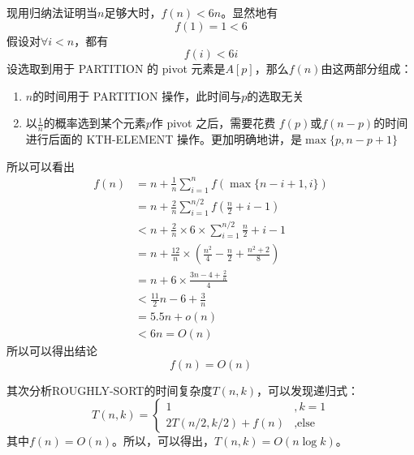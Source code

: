 \documentclass[UTF8]{ctexart}
\begin{document}
现用归纳法证明当$n$足够大时，$f(n) < 6n$。显然地有
$$f(1) = 1 < 6$$
假设对$\forall i < n$，都有
$$f(i) < 6i$$
设选取到用于 PARTITION 的 pivot 元素是$A[p]$，那么$f(n)$由这两部分组成：
\begin{enumerate}
    \item $n$的时间用于 PARTITION 操作，此时间与$p$的选取无关
    \item 以$\frac{1}{n}$的概率选到某个元素$p$作 pivot 之后，需要花费 $f(p)$或$f(n-p)$的时间进行后面的 KTH-ELEMENT 操作。更加明确地讲，是$\max\{p, n-p+1\}$
\end{enumerate}
所以可以看出
\begin{align*}
    f(n) 
    &= n + \frac{1}{n}\sum_{i=1}^{n}{f\left(\max\{n-i+1, i\}\right)} \\   
    &= n + \frac{2}{n}\sum_{i=1}^{n/2}{f\left(\frac{n}{2}+i-1\right)} \\
    &< n + \frac{2}{n}\times 6\times \sum_{i=1}^{n/2}{\frac{n}{2}+i-1} \\
    &= n + \frac{12}{n}\times\left(\frac{n^2}{4}-\frac{n}{2}+\frac{n^2+2}{8}\right) \\
    &= n + 6\times\frac{3n-4+\frac{2}{n}}{4} \\
    &< \frac{11}{2}n-6+\frac{3}{n} \\
    &= 5.5n + o(n) \\
    &< 6n = O(n)
\end{align*}
所以可以得出结论
$$f(n) = O(n)$$

其次分析ROUGHLY-SORT的时间复杂度$T(n, k)$，可以发现递归式：
\begin{equation*}
    T(n, k) = 
    \begin{cases}
        1 &, k = 1 \\
        2T(n/2, k/2) + f(n) &, \text{else}
    \end{cases}
\end{equation*}
其中$f(n) = O(n)$。所以，可以得出，$T(n, k) = O(n\log k)$。

\section{} %
\end{document}
